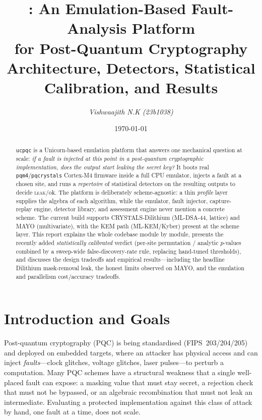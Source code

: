 \documentclass[11pt]{article}
\title{\textbf{\ucpqc: An Emulation-Based Fault-Analysis Platform\\
for Post-Quantum Cryptography}\\[4pt]
\large Architecture, Detectors, Statistical Calibration, and Results}
\author{\textit{Vishwaajith N.K (23b1038)}}
\date{\today}
\newcommand{\code}[1]{\texttt{#1}}
\newcommand{\ucpqc}{\code{ucpqc}}
\begin{document}
\maketitle

\begin{abstract}
\noindent
\ucpqc{} is a Unicorn-based emulation platform that answers one mechanical
question at scale: \emph{if a fault is injected at this point in a post-quantum
cryptographic implementation, does the output start leaking the secret key?} It
boots real \code{pqm4}/\code{pqcrystals} Cortex-M4 firmware inside a full CPU
emulator, injects a fault at a chosen site, and runs a \emph{repertoire} of
statistical detectors on the resulting outputs to decide \textsc{leak}/ok. The
platform is deliberately scheme-agnostic: a thin \emph{profile} layer supplies
the algebra of each algorithm, while the emulator, fault injector, capture-replay
engine, detector library, and assessment engine never mention a concrete scheme.
The current build supports CRYSTALS-Dilithium (ML-DSA-44, lattice) and MAYO
(multivariate), with the KEM path (ML-KEM/Kyber) present at the scheme layer. This
report explains the whole codebase module by module, presents the recently added
\emph{statistically calibrated} verdict (per-site permutation / analytic
$p$-values combined by a sweep-wide false-discovery-rate rule, replacing hand-tuned
thresholds), and discusses the design tradeoffs and empirical results---including
the headline Dilithium mask-removal leak, the honest limits observed on MAYO, and
the emulation and parallelism cost/accuracy tradeoffs.
\end{abstract}

\tableofcontents
\bigskip

\section{Introduction and Goals}

Post-quantum cryptography (PQC) is being standardised (FIPS~203/204/205) and
deployed on embedded targets, where an attacker has physical access and can
inject \emph{faults}---clock glitches, voltage glitches, laser pulses---to perturb
a computation. Many PQC schemes have a structural weakness that a single
well-placed fault can expose: a masking value that must stay secret, a rejection
check that must not be bypassed, or an algebraic recombination that must not leak
an intermediate. Evaluating a protected implementation against this class of
attack by hand, one fault at a time, does not scale.
\end{document}
